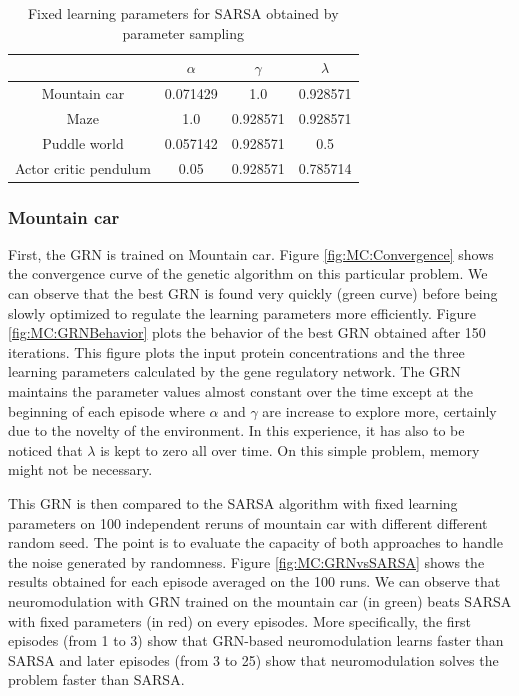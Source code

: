 \begin{table}[h]
\begin{tabular}{|c|ccc|}
\cline{2-4}
\multicolumn{1}{c|}{ }	& $\alpha$	& $\gamma$	& $\lambda$	\\\hline
Mountain car			& 0.071429	& 1.0		& 0.928571 	\\%
Maze				& 1.0		& 0.928571	& 0.928571	\\%
Puddle world			&  0.057142	& 0.928571	& 0.5		\\%
Actor critic pendulum	& 0.05		& 0.928571	& 0.785714	\\\hline
\end{tabular}
\caption{Fixed learning parameters for SARSA obtained by parameter sampling}\label{tab:SARSAFixedParams}
\end{table}

\subsubsection{Mountain car}
First, the GRN is trained on Mountain car. Figure \ref{fig:MC:Convergence} shows the convergence curve of the genetic algorithm on this particular problem. We can observe that the best GRN is found very quickly (green curve) before being slowly optimized to regulate the learning parameters more efficiently. Figure \ref{fig:MC:GRNBehavior} plots the behavior of the best GRN obtained after 150 iterations. This figure plots the input protein concentrations and the three learning parameters calculated by the gene regulatory network. The GRN maintains the parameter values almost constant over the time except at the beginning of each episode where $\alpha$ and $\gamma$ are increase to explore more, certainly due to the novelty of the environment. In this experience, it has also to be noticed that $\lambda$ is kept to zero all over time. On this simple problem, memory might not be necessary. 

This GRN is then compared to the SARSA algorithm with fixed learning parameters on 100 independent reruns of mountain car with different different random seed. The point is to evaluate the capacity of both approaches to handle the noise generated by randomness. Figure \ref{fig:MC:GRNvsSARSA} shows the results obtained for each episode averaged on the 100 runs. We can observe that neuromodulation with GRN trained on the mountain car (in green) beats SARSA with fixed parameters (in red) on every episodes. More specifically, the first episodes (from 1 to 3) show that GRN-based neuromodulation learns faster than SARSA and later episodes (from 3 to 25) show that neuromodulation solves the problem faster than SARSA.

